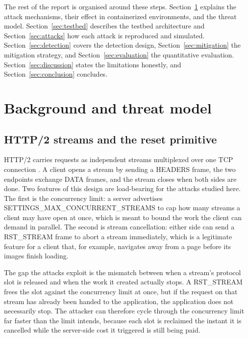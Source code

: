 \documentclass[a4paper,fleqn]{cas-dc}
\begin{document}
The rest of the report is organised around these steps. Section~\ref{sec:background} explains the attack mechanisms, their effect in containerized environments, and the threat model. Section~\ref{sec:testbed} describes the testbed architecture and Section~\ref{sec:attacks} how each attack is reproduced and simulated. Section~\ref{sec:detection} covers the detection design, Section~\ref{sec:mitigation} the mitigation strategy, and Section~\ref{sec:evaluation} the quantitative evaluation. Section~\ref{sec:discussion} states the limitations honestly, and Section~\ref{sec:conclusion} concludes.

\section{Background and threat model}\label{sec:background}

\subsection{HTTP/2 streams and the reset primitive}\label{sec:http2-background}

HTTP/2 carries requests as independent streams multiplexed over one TCP connection \cite{rfc9113}. A client opens a stream by sending a HEADERS frame, the two endpoints exchange DATA frames, and the stream closes when both sides are done. Two features of this design are load-bearing for the attacks studied here. The first is the concurrency limit: a server advertises SETTINGS\_MAX\_CONCURRENT\_STREAMS to cap how many streams a client may have open at once, which is meant to bound the work the client can demand in parallel. The second is stream cancellation: either side can send a RST\_STREAM frame to abort a stream immediately, which is a legitimate feature for a client that, for example, navigates away from a page before its images finish loading.

The gap the attacks exploit is the mismatch between when a stream's protocol slot is released and when the work it created actually stops. A RST\_STREAM frees the slot against the concurrency limit at once, but if the request on that stream has already been handed to the application, the application does not necessarily stop. The attacker can therefore cycle through the concurrency limit far faster than the limit intends, because each slot is reclaimed the instant it is cancelled while the server-side cost it triggered is still being paid.
\end{document}
